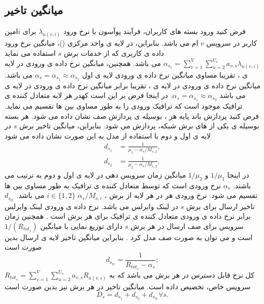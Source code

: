 \subsection{میانگین تاخیر}
فرض کنید ورود بسته های کاربران، فرآیند پوآسون با نرخ ورود 
$\lambda_{u(v,i)}$
برای $i$امین کاربر در سرویس $v$ ام می باشد.
بنابراین، در لایه ی واحد مرکزی ()، میانگین نرخ ورود داده ی کاربری که از خدمات برش $s$ استفاده می نماید 
$\alpha_{s_1} = \sum_{v=1}^{V}\sum_{u=2}^{U_v}a_{v,s}\lambda_{u(v,i)}$
می باشد. 
همچنین، میانگین نرخ داده ی ورودی در لایه ی ، تقریبا مساوی میانگین نرخ داده ی ورودی لایه ی اول 
$\alpha_{s} =\alpha_{s_1} \approx \alpha_{s_2}$
می باشد.
میانگین نرخ داده ی ورودی در لایه ی ، تقریبا برابر میانگین نرخ داده ی ورودی در لایه ی  می باشد $\alpha_{s} =\alpha_{s_1} \approx \alpha_{s_2}$.
در اینجا فرض بر این است کهدر هر لایه متعادل کننده ی ترافیک موجود است که ترافیک ورودی را به طور مساوی بین  ها تقسیم می نماید\cite{frdl,luong2018novel,luong2018novel1}.
فرض کنید پردازش باند پایه هر ، بوسیله ی پردازش صف  نشان داده می شود.
هر بسته بوسیله ی یکی از های برش شبکه، پردازش می شود.
بنابراین، میانگین تاخیر برش $s$ در لایه ی اول و دوم با استفاده از مدل  به این صورت نشان داده می شود
\begin{equation}
\begin{split}
d_{s_1} &= \frac{1}{\mu_1 - \alpha_{s}/{M_{s,1}}},\\
d_{s_2} &= \frac{1}{\mu_2 - \alpha_{s}/{M_{s,2}}}.
\end{split}
\end{equation}
در اینجا
$1/\mu_1$ و $1/\mu_2$
میانگین زمان سرویس دهی در لایه ی اول و دوم به ترتیب می باشند.
$\alpha_{s}$
نرخ ورودی است که توسط متعادل کننده ی ترافیک به طور مساوی بین  ها تقسیم می شود.
نرخ ورودی هر  در هر لایه از برش ، $\alpha_{s}/{M_{s,i}}$ $ i \in \{1,2\}$ می باشد.
$d_{s_{tr}}$
تاخیر ارسال برای برش $s$ در لینک وایرلس می باشد.
نرخ داده ی ورودی لینک وایرلس برابر نرخ داده ی ورودی متعادل کننده ی ترافیک برای هر برش است
\cite{frdl}.
همچنین زمان سرویس برای صف ارسال در هر برش $s$ دارای توزیع نمایی با میانگین $1/(R_{{tot}_s})$
است و می توان به صورت صف  مدل کرد  
\cite{frdl,luong2018novel,luong2018novel1,guo2016exploiting}.
بنابراین میانگین تاخیر لایه ی ارسال بدین صورت است
\begin{equation}
 d_{s_{tr}} = \frac{1}{R_{{tot}_s} - \alpha_{s}};
\end{equation}
 $R_{{tot}_s} =  \sum_{v=1}^{V}\sum_{u=2}^{U_v}a_{v,s}R_{u(v,i)}$ 
 کل نرخ قابل دسترس در هر برش می باشد که به سرویس خاص، تخصیص داده است.
میانگین تاخیر در هر برش نیز بدین صورت است
\begin{equation}
D_{s} = d_{s_1} + d_{s_2} + d_{s_{tr}} \forall s.
\end{equation}
